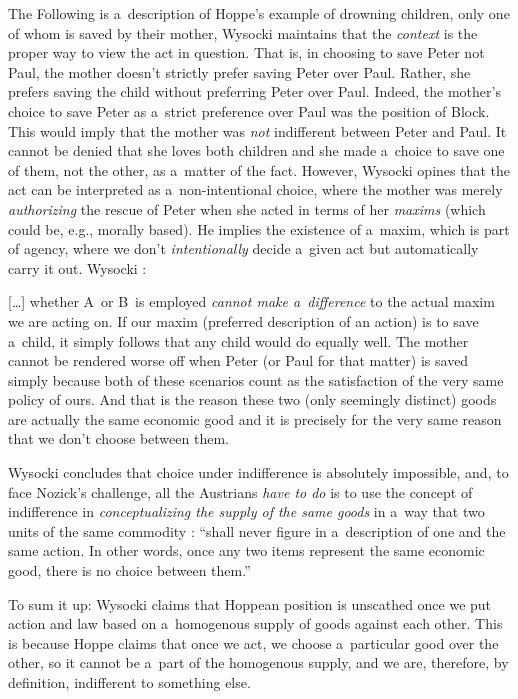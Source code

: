 The Following is a~description of Hoppe's example of drowning children, only one of whom is saved by their mother, Wysocki maintains that the \textit{context} is the proper way to view the act in question. That is, in choosing to save Peter not Paul, the mother doesn't strictly prefer saving Peter over Paul. Rather, she prefers saving the child without preferring Peter over Paul. Indeed, the mother's choice to save Peter as a~strict preference over Paul was the position of Block. This would imply that the mother was \textit{not} indifferent between Peter and Paul. It cannot be denied that she loves both children and she made a~choice to save one of them, not the other, as a~matter of the fact. However, Wysocki opines that the act can be interpreted as a~non-intentional choice, where the mother was merely \textit{authorizing} the rescue of Peter when she acted in terms of her \textit{maxims} (which could be, e.g., morally based). He implies the existence of a~maxim, which is part of agency, where we don't \textit{intentionally} decide a~given act but automatically carry it out. Wysocki 
\parencite*[][emphasis his]{}:%




[…] whether A~or B~is employed \textit{cannot make a~difference} to the actual maxim we are acting on. If our maxim (preferred description of an action) is to save a~child, it simply follows that any child would do equally well. The mother cannot be rendered worse off when Peter (or Paul for that matter) is saved simply because both of these scenarios count as the satisfaction of the very same policy of ours. And that is the reason these two (only seemingly distinct) goods are actually the same economic good and it is precisely for the very same reason that we don't choose between them.



Wysocki concludes that choice under indifference is absolutely impossible, and, to face Nozick's challenge, all the Austrians \textit{have to do} is to use the concept of indifference in \textit{conceptualizing the supply of the same goods} in a~way that two units of the same commodity 
\parencite[][p.37]{}: %
 ``shall never figure in a~description of one and the same action. In other words, once any two items represent the same economic good, there is no choice between them.''



To sum it up: Wysocki claims that Hoppean position is unscathed once we put action and law based on a~homogenous supply of goods against each other. This is because Hoppe claims that once we act, we choose a~particular good over the other, so it cannot be a~part of the homogenous supply, and we are, therefore, by definition, indifferent to something else.



